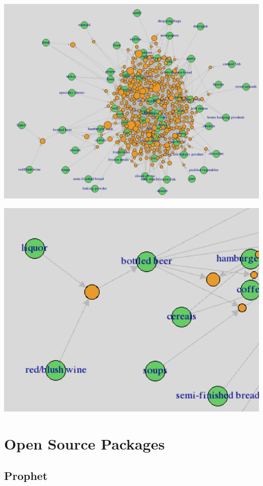 \documentclass[
]{book}
\begin{document}
\includegraphics[width=14.75in]{figure/arulesViz}

\includegraphics[width=5.38in]{figure/arulesVizBig}

\hypertarget{open-source-packages}{%
\section{Open Source Packages}\label{open-source-packages}}

\hypertarget{prophet}{%
\subsection{Prophet}\label{prophet}}
\end{document}
